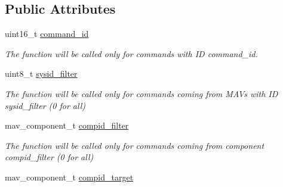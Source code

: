 \subsection*{Public Attributes}
\begin{DoxyCompactItemize}
\item 
\hypertarget{structmavlink__message__handler__cmd__callback__t_a8536861198730d7c767faf04a996d4a1}{uint16\+\_\+t \hyperlink{structmavlink__message__handler__cmd__callback__t_a8536861198730d7c767faf04a996d4a1}{command\+\_\+id}}\label{structmavlink__message__handler__cmd__callback__t_a8536861198730d7c767faf04a996d4a1}

\begin{DoxyCompactList}\small\item\em The function will be called only for commands with I\+D command\+\_\+id. \end{DoxyCompactList}\item 
\hypertarget{structmavlink__message__handler__cmd__callback__t_aee5acda6446d0f035cf85512b23b5420}{uint8\+\_\+t \hyperlink{structmavlink__message__handler__cmd__callback__t_aee5acda6446d0f035cf85512b23b5420}{sysid\+\_\+filter}}\label{structmavlink__message__handler__cmd__callback__t_aee5acda6446d0f035cf85512b23b5420}

\begin{DoxyCompactList}\small\item\em The function will be called only for commands coming from M\+A\+Vs with I\+D sysid\+\_\+filter (0 for all) \end{DoxyCompactList}\item 
\hypertarget{structmavlink__message__handler__cmd__callback__t_a7fa053317e0aca444bcc38e1d2208a4d}{mav\+\_\+component\+\_\+t \hyperlink{structmavlink__message__handler__cmd__callback__t_a7fa053317e0aca444bcc38e1d2208a4d}{compid\+\_\+filter}}\label{structmavlink__message__handler__cmd__callback__t_a7fa053317e0aca444bcc38e1d2208a4d}

\begin{DoxyCompactList}\small\item\em The function will be called only for commands coming from component compid\+\_\+filter (0 for all) \end{DoxyCompactList}\item 
\hypertarget{structmavlink__message__handler__cmd__callback__t_abe619619dde56eff3e56d156d033b7b5}{mav\+\_\+component\+\_\+t \hyperlink{structmavlink__message__handler__cmd__callback__t_abe619619dde56eff3e56d156d033b7b5}{compid\+\_\+target}}\label{structmavlink__message__handler__cmd__callback__t_abe619619dde56eff3e56d156d033b7b5}


\end{DoxyCompactItemize}
